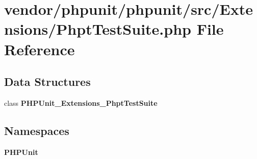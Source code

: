\section{vendor/phpunit/phpunit/src/\+Extensions/\+Phpt\+Test\+Suite.php File Reference}
\label{_phpt_test_suite_8php}
\subsection*{Data Structures}
\begin{DoxyCompactItemize}
\item 
class {\bf P\+H\+P\+Unit\+\_\+\+Extensions\+\_\+\+Phpt\+Test\+Suite}
\end{DoxyCompactItemize}
\subsection*{Namespaces}
\begin{DoxyCompactItemize}
\item 
 {\bf P\+H\+P\+Unit}
\end{DoxyCompactItemize}
